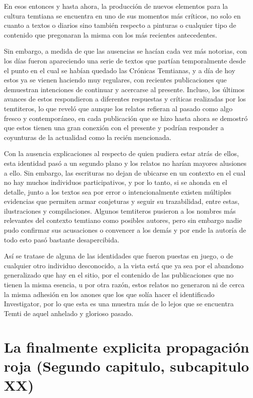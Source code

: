 \documentclass[
  spanish,
]{book}
\begin{document}
En esos entonces y hasta ahora, la producción de nuevos elementos para la cultura temtiana se encuentra en uno de sus momentos más críticos, no solo en cuanto a textos o diarios sino también respecto a pinturas o cualquier tipo de contenido que pregonaran la misma con los más recientes antecedentes.

Sin embargo, a medida de que las ausencias se hacían cada vez más notorias, con los días fueron apareciendo una serie de textos que partían temporalmente desde el punto en el cual se habían quedado las Crónicas Temtianas, y a día de hoy estos ya se vienen haciendo muy regulares, con recientes publicaciones que demuestran intenciones de continuar y acercarse al presente. Incluso, los últimos avances de estos respondieron a diferentes respuestas y críticas realizadas por los temtiteros, lo que reveló que aunque los relatos refieran al pasado como algo fresco y contemporáneo, en cada publicación que se hizo hasta ahora se demostró que estos tienen una gran conexión con el presente y podrían responder a coyunturas de la actualidad como la recién mencionada.

Con la ausencia explicaciones al respecto de quien pudiera estar atrás de ellos, esta identidad pasó a un segundo plano y los relatos no harían mayores alusiones a ello. Sin embargo, las escrituras no dejan de ubicarse en un contexto en el cual no hay muchos individuos participativos, y por lo tanto, si se ahonda en el detalle, junto a los textos sea por error o intencionalmente existen múltiples evidencias que permiten armar conjeturas y seguir su trazabilidad, entre estas, ilustraciones y compilaciones. Algunos temtiteros pusieron a los nombres más relevantes del contexto temtiano como posibles autores, pero sin embargo nadie pudo confirmar sus acusaciones o convencer a los demás y por ende la autoría de todo esto pasó bastante desapercibida.

Así se tratase de alguna de las identidades que fueron puestas en juego, o de cualquier otro individuo desconocido, a la vista está que ya sea por el abandono generalizado que hay en el sitio, por el contenido de las publicaciones que no tienen la misma esencia, u por otra razón, estos relatos no generaron ni de cerca la misma adhesión en los anones que los que solía hacer el identificado Investigator, por lo que esta es una muestra más de lo lejos que se encuentra Temti de aquel anhelado y glorioso pasado.

\hypertarget{la-finalmente-explicita-propagaciuxf3n-roja-segundo-capitulo-subcapitulo-xx}{%
\section{La finalmente explicita propagación roja (Segundo capitulo, subcapitulo XX)}\label{la-finalmente-explicita-propagaciuxf3n-roja-segundo-capitulo-subcapitulo-xx}}
\end{document}
